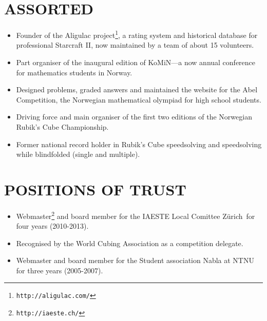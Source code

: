 \documentclass[line,margin]{res}
\newcommand{\zh}{Z\"{u}rich}
\begin{document}
\begin{resume}
\section{ASSORTED}

\begin{itemize}
\item Founder of the Aligulac project\footnote{{\tt http://aligulac.com/}}, a rating system and
  historical database for professional Starcraft II, now maintained by a team of about 15 volunteers.
\item Part organiser of the inaugural edition of KoMiN---a now annual conference for mathematics
  students in Norway.
\item Designed problems, graded answers and maintained the website for the Abel Competition, the
  Norwegian mathematical olympiad for high school students.
\item Driving force and main organiser of the first two editions of the Norwegian Rubik's Cube
  Championship.
\item Former national record holder in Rubik's Cube speedsolving and speedsolving while blindfolded
  (single and multiple).
\end{itemize}

\newpage


\section{POSITIONS OF TRUST}

\begin{itemize}
\item Webmaster\footnote{{\tt http://iaeste.ch/}} and board member for the IAESTE Local Comittee
  \zh\ for four years (2010-2013).
\item Recognised by the World Cubing Association as a competition delegate.
\item Webmaster and board member for the Student association Nabla at NTNU for three years
  (2005-2007).
\end{itemize}







\end{resume}
\end{document}
